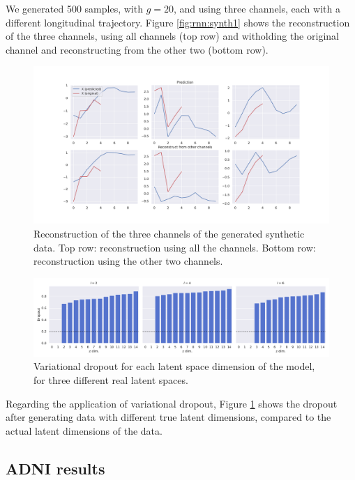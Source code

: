 We generated 500 samples, with $g=20$, and using three channels, each with a different longitudinal trajectory. Figure \ref{fig:rnn:synth1} shows the reconstruction of the three channels, using all channels (top row) and witholding the original channel and reconstructing from the other two (bottom row). 

\begin{figure}[!htbp]
  \centering
  \includegraphics[width=1.0\textwidth]{figures/rnnvae/synth_recon.pdf}
  \caption[Synthetic data reconstruction.]{Reconstruction of the three channels of the generated synthetic data. Top row: reconstruction using all the channels. Bottom row: reconstruction using the other two channels.}\label{fig:rnn:synth2}
\end{figure}

\begin{figure}[!htbp]
  \centering
  \includegraphics[width=1.0\textwidth]{figures/rnnvae/synthvardrop.pdf}
  \caption[Variational dropout.]{Variational dropout for each latent space dimension of the model, for three different real latent spaces.}\label{fig:rnn:synthvar}
\end{figure}

Regarding the application of variational dropout, Figure \ref{fig:rnn:synth2} shows the dropout after generating data with different true latent dimensions, compared to the actual latent dimensions of the data.

\subsection{ADNI results}

